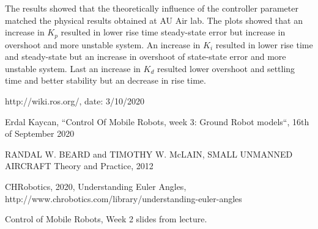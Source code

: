 \documentclass[conference]{IEEEtran}
\begin{document}
The results showed that the theoretically influence of the controller parameter matched the physical results obtained at AU Air lab. The plots showed that an increase in $K_p$ resulted in lower rise time steady-state error but increase in overshoot and more unstable system. An increase in $K_i$ resulted in lower rise time and steady-state but an increase in overshoot of state-state error and more unstable system. Last an increase in $K_d$ resulted lower overshoot and settling time and better stability but an decrease in rise time. 


\begin{thebibliography}{00}

 http://wiki.ros.org/, date: 3/10/2020

 Erdal Kaycan, ``Control Of Mobile Robots, week 3: Ground Robot models``, 16th of September 2020

 RANDAL W. BEARD and TIMOTHY W. McLAIN, SMALL UNMANNED AIRCRAFT Theory and Practice, 2012

 CHRobotics, 2020, Understanding Euler Angles, http://www.chrobotics.com/library/understanding-euler-angles

 Control of Mobile Robots, Week 2 slides from lecture.

\end{thebibliography}
\vspace{12pt}
\end{document}
